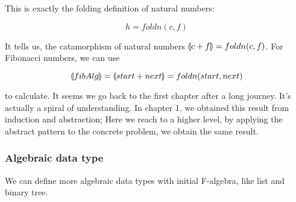 \documentclass{article}
\begin{document}
This is exactly the folding definition of natural numbers:

\[
  h = foldn(c, f)
\]

It tells us, the catamorphism of natural numbers $\llparenthesis c + f \rrparenthesis = foldn(c, f)$. For Fibonacci numbers, we can use

\[
\llparenthesis fibAlg \rrparenthesis = \llparenthesis start + next \rrparenthesis = foldn(start, next)
\]

to calculate. It seems we go back to the first chapter after a long journey. It's actually a spiral of understanding. In chapter 1, we obtained this result from induction and abstraction; Here we reach to a higher level, by applying the abstract pattern to the concrete problem, we obtain the same result.

\subsubsection{Algebraic data type}

We can define more algebraic data types with initial F-algebra, like list and binary tree.
\end{document}
